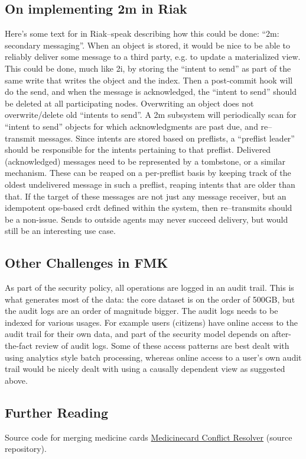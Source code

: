 \documentclass[11pt,a4paper]{report}
\begin{document}
\subsection{On implementing 2m in Riak}
Here's some text for in Riak--speak describing how this could be done: ``2m: secondary messaging''. When an object is stored, it would be nice to be able to reliably deliver some message to a third party, e.g. to update a materialized view.
This could be done, much like 2i, by storing the ``intent to send'' as part of the same write that writes the object and the index. Then a post-commit hook will do the send, and when the message is acknowledged, the ``intent to send'' should be deleted at all participating nodes.
Overwriting an object does not overwrite/delete old ``intents to send''. A 2m subsystem will periodically scan for ``intent to send'' objects for which acknowledgments are past due, and re--transmit messages. Since intents are stored based on preflists, a ``preflist leader'' should be responsible for the intents pertaining to that preflist.
Delivered (acknowledged) messages need to be represented by a tombstone, or a similar mechanism.
These can be reaped on a per-preflist basis by keeping track of the oldest undelivered message in such a preflist, reaping intents that are older than that.
If the target of these messages are not just any message receiver, but an idempotent ops-based \gls{crdt} defined within the system, then re--transmits should be a non-issue. Sends to outside agents may never succeed delivery, but would still be an interesting use case.

\subsection{Other Challenges in FMK}
As part of the security policy, all operations are logged in an audit trail. This is what generates most of the data: the core dataset is on the order of 500GB, but the audit logs are an order of magnitude bigger.
The audit logs needs to be indexed for various usages. For example users (citizens) have online access to the audit trail for their own data, and part of the security model depends on after-the-fact review of audit logs. Some of these access patterns are best dealt with using analytics style batch processing, whereas online access to a user's own audit trail would be nicely dealt with using a causally dependent view as suggested above.

\subsection{Further Reading}
Source code for merging medicine cards \hyperlink{https://gist.github.com/rsltrifork/b1c648fe02bc0547389c}{Medicinecard Conflict Resolver} (source repository).
\end{document}
